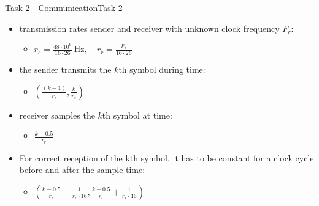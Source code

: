 {\begin{frame}{Task 2 - Communication}{Task 2}
  \begin{solutionnoinc}
    \begin{itemize}
      \item \alert{transmission rates sender and receiver with unknown clock frequency $F_r$:}
      \begin{itemize}
        \item $r_s=\frac{48 \cdot 10^6}{16 \cdot 26} \mathrm{~Hz}, \quad r_r=\frac{F_r}{16 \cdot 26}$
      \end{itemize}
      \item \alert{the sender transmits the $k$th symbol during time:}
      \begin{itemize}
        \item $\left(\frac{(k-1)}{r_s}, \frac{k}{r_s}\right)$
      \end{itemize}
      \item \alert{receiver samples the $k$th symbol at time:}
      \begin{itemize}
        \item $\frac{k-0.5}{r_r}$
      \end{itemize}
      \item \alert{For correct reception of the kth symbol, it has to be constant for a clock cycle before and after the sample time:}
      \begin{itemize}
        \item $\left(\frac{k-0.5}{r_r}-\frac{1}{r_r \cdot 16}, \frac{k-0.5}{r_r}+\frac{1}{r_r \cdot 16}\right)$
      \end{itemize}
    \end{itemize}
  \end{solutionnoinc}


\end{frame}}
